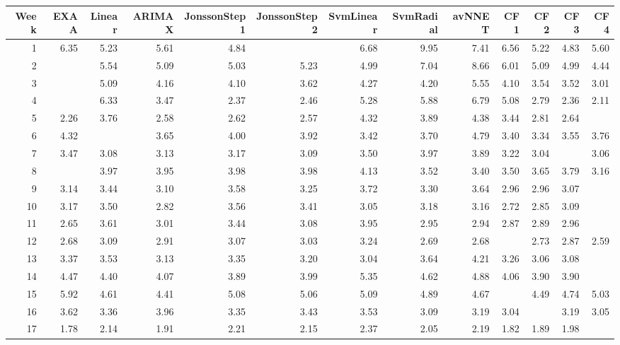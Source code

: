 \begin{tabular}{rrrrrrrrrrrrr}
  \hline
Week & EXAA & Linear & ARIMAX & JonssonStep1 & JonssonStep2 & SvmLinear & SvmRadial & avNNET & CF1 & CF2 & CF3 & CF4 \\ 
  \hline
1 & 6.35 & 5.23 & 5.61 & 4.84 & \color{blue}{4.72} & 6.68 & 9.95 & 7.41 & 6.56 & 5.22 & 4.83 & 5.60 \\ 
  2 & \color{blue}{3.99} & 5.54 & 5.09 & 5.03 & 5.23 & 4.99 & 7.04 & 8.66 & 6.01 & 5.09 & 4.99 & 4.44 \\ 
  3 & \color{blue}{2.95} & 5.09 & 4.16 & 4.10 & 3.62 & 4.27 & 4.20 & 5.55 & 4.10 & 3.54 & 3.52 & 3.01 \\ 
  4 & \color{blue}{2.06} & 6.33 & 3.47 & 2.37 & 2.46 & 5.28 & 5.88 & 6.79 & 5.08 & 2.79 & 2.36 & 2.11 \\ 
  5 & 2.26 & 3.76 & 2.58 & 2.62 & 2.57 & 4.32 & 3.89 & 4.38 & 3.44 & 2.81 & 2.64 & \color{blue}{2.19} \\ 
  6 & 4.32 & \color{blue}{3.25} & 3.65 & 4.00 & 3.92 & 3.42 & 3.70 & 4.79 & 3.40 & 3.34 & 3.55 & 3.76 \\ 
  7 & 3.47 & 3.08 & 3.13 & 3.17 & 3.09 & 3.50 & 3.97 & 3.89 & 3.22 & 3.04 & \color{blue}{3.02} & 3.06 \\ 
  8 & \color{blue}{3.12} & 3.97 & 3.95 & 3.98 & 3.98 & 4.13 & 3.52 & 3.40 & 3.50 & 3.65 & 3.79 & 3.16 \\ 
  9 & 3.14 & 3.44 & 3.10 & 3.58 & 3.25 & 3.72 & 3.30 & 3.64 & 2.96 & 2.96 & 3.07 & \color{blue}{2.94} \\ 
  10 & 3.17 & 3.50 & 2.82 & 3.56 & 3.41 & 3.05 & 3.18 & 3.16 & 2.72 & 2.85 & 3.09 & \color{blue}{2.68} \\ 
  11 & 2.65 & 3.61 & 3.01 & 3.44 & 3.08 & 3.95 & 2.95 & 2.94 & 2.87 & 2.89 & 2.96 & \color{blue}{2.55} \\ 
  12 & 2.68 & 3.09 & 2.91 & 3.07 & 3.03 & 3.24 & 2.69 & 2.68 & \color{blue}{2.59} & 2.73 & 2.87 & 2.59 \\ 
  13 & 3.37 & 3.53 & 3.13 & 3.35 & 3.20 & 3.04 & 3.64 & 4.21 & 3.26 & 3.06 & 3.08 & \color{blue}{3.04} \\ 
  14 & 4.47 & 4.40 & 4.07 & 3.89 & 3.99 & 5.35 & 4.62 & 4.88 & 4.06 & 3.90 & 3.90 & \color{blue}{3.80} \\ 
  15 & 5.92 & 4.61 & 4.41 & 5.08 & 5.06 & 5.09 & 4.89 & 4.67 & \color{blue}{4.36} & 4.49 & 4.74 & 5.03 \\ 
  16 & 3.62 & 3.36 & 3.96 & 3.35 & 3.43 & 3.53 & 3.09 & 3.19 & 3.04 & \color{blue}{3.02} & 3.19 & 3.05 \\ 
  17 & 1.78 & 2.14 & 1.91 & 2.21 & 2.15 & 2.37 & 2.05 & 2.19 & 1.82 & 1.89 & 1.98 & \color{blue}{1.57} \\ 

\end{tabular}
